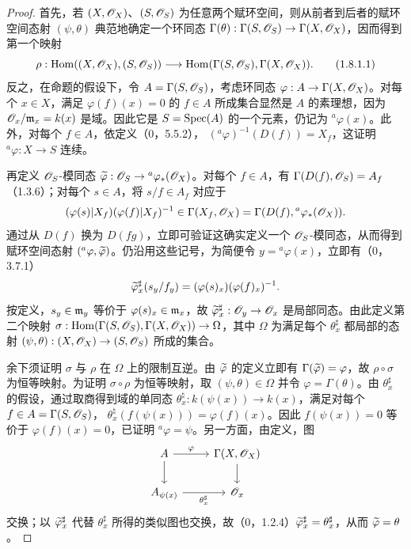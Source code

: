 \begin{proof}
首先，若 $(X,\mathscr O_X)$、$(S,\mathscr O_S)$ 为任意两个赋环空间，则从前者到后者的赋环空间态射 $(\psi,\theta)$ 典范地确定一个环同态
$\Gamma(\theta):\Gamma(S,\mathscr O_S)\to\Gamma(X,\mathscr O_X)$，因而得到第一个映射
\begin{equation}
\rho:\operatorname{Hom}((X,\mathscr O_X),(S,\mathscr O_S))\longrightarrow
\operatorname{Hom}(\Gamma(S,\mathscr O_S),\Gamma(X,\mathscr O_X)).\tag{1.8.1.1}
\end{equation}
反之，在命题的假设下，令 $A=\Gamma(S,\mathscr O_S)$，考虑环同态 $\varphi:A\to\Gamma(X,\mathscr O_X)$。对每个 $x\in X$，满足 $\varphi(f)(x)=0$ 的 $f\in A$ 所成集合显然是 $A$ 的素理想，因为 $\mathscr O_x/\mathfrak m_x=k(x)$ 是域。因此它是 $S=\operatorname{Spec}(A)$ 的一个元素，仍记为 ${}^a\varphi(x)$。此外，对每个 $f\in A$，依定义（0，5.5.2），
$({}^a\varphi)^{-1}(D(f))=X_f$，这证明 ${}^a\varphi:X\to S$ 连续。

再定义 $\mathscr O_S$-模同态 $\widetilde{\varphi}:\mathscr O_S\to{}^a\varphi_*(\mathscr O_X)$。对每个 $f\in A$，有 $\Gamma(D(f),\mathscr O_S)=A_f$（1.3.6）；对每个 $s\in A$，将 $s/f\in A_f$ 对应于
\[
(\varphi(s)|X_f)(\varphi(f)|X_f)^{-1}\in
\Gamma(X_f,\mathscr O_X)=\Gamma(D(f),{}^a\varphi_*(\mathscr O_X)).
\]
通过从 $D(f)$ 换为 $D(fg)$，立即可验证这确实定义一个 $\mathscr O_S$-模同态，从而得到赋环空间态射 $({}^a\varphi,\widetilde{\varphi})$。仍沿用这些记号，为简便令 $y={}^a\varphi(x)$，立即有（0，3.7.1）
\[
\widetilde{\varphi}_x^\sharp(s_y/f_y)=(\varphi(s)_x)(\varphi(f)_x)^{-1}.
\]
按定义，$s_y\in\mathfrak m_y$ 等价于 $\varphi(s)_x\in\mathfrak m_x$，故 $\widetilde{\varphi}_x^\sharp:\mathscr O_y\to\mathscr O_x$ 是局部同态。由此定义第二个映射
$\sigma:\operatorname{Hom}(\Gamma(S,\mathscr O_S),\Gamma(X,\mathscr O_X))\to\Omega$，其中 $\Omega$ 为满足每个 $\theta_x^\sharp$ 都局部的态射 $(\psi,\theta):(X,\mathscr O_X)\to(S,\mathscr O_S)$ 所成的集合。

余下须证明 $\sigma$ 与 $\rho$ 在 $\Omega$ 上的限制互逆。由 $\widetilde{\varphi}$ 的定义立即有 $\Gamma(\widetilde{\varphi})=\varphi$，故 $\rho\circ\sigma$ 为恒等映射。为证明 $\sigma\circ\rho$ 为恒等映射，取 $(\psi,\theta)\in\Omega$ 并令 $\varphi=\Gamma(\theta)$。由 $\theta_x^\sharp$ 的假设，通过取商得到域的单同态
$\theta_x^\natural:k(\psi(x))\to k(x)$，满足对每个 $f\in A=\Gamma(S,\mathscr O_S)$，
$\theta_x^\natural(f(\psi(x)))=\varphi(f)(x)$。因此 $f(\psi(x))=0$ 等价于 $\varphi(f)(x)=0$，已证明 ${}^a\varphi=\psi$。另一方面，由定义，图
\[
\begin{tikzcd}
A\arrow[r,"\varphi"]\arrow[d]&\Gamma(X,\OO_X)\arrow[d]\\
A_{\psi(x)}\arrow[r,"\theta_x^\sharp"']&\OO_x
\end{tikzcd}
\]
交换；以 $\widetilde{\varphi}_x^\sharp$ 代替 $\theta_x^\sharp$ 所得的类似图也交换，故（0，1.2.4）$\widetilde{\varphi}_x^\sharp=\theta_x^\sharp$，从而 $\widetilde{\varphi}=\theta$。
\end{proof}

